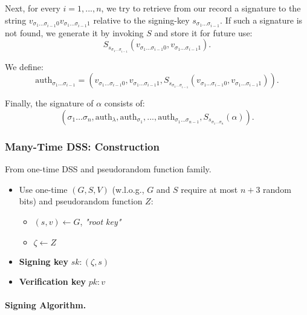 \begin{center}
{\begin{minipage}{\textwidth-1cm}
Next, for every $i = 1, ..., n$, we try to retrieve from our record a signature to the string $v_{\sigma_1 \dots \sigma_{i-1}0} v_{\sigma_1 \dots \sigma_{i-1}1}$ relative to the signing-key $s_{\sigma_1 \dots \sigma_{i-1}}$. If such a signature is not found, we generate it by invoking $S$ and store it for future use:
\[
S_{s_{\sigma_1 \dots \sigma_{i-1}}}(v_{\sigma_1 \dots \sigma_{i-1}0}, v_{\sigma_1 \dots \sigma_{i-1}1}).
\]

We define:
\[
\text{auth}_{\sigma_1 \dots \sigma_{i-1}} = (v_{\sigma_1 \dots \sigma_{i-1}0}, v_{\sigma_1 \dots \sigma_{i-1}1}, S_{s_{\sigma_1 \dots \sigma_{i-1}}}(v_{\sigma_1 \dots \sigma_{i-1}0}, v_{\sigma_1 \dots \sigma_{i-1}1})).
\]

Finally, the signature of $\alpha$ consists of:
\[
(\sigma_1 \dots \sigma_n, \text{auth}_\lambda, \text{auth}_{\sigma_1}, ..., \text{auth}_{\sigma_1 \dots \sigma_{n-1}}, S_{s_{\sigma_1 \dots \sigma_n}}(\alpha)).
\]
\end{minipage}}\end{center}

\subsubsection{Many-Time DSS: Construction}

From one-time DSS and pseudorandom function family.

\begin{itemize}
    \item Use one-time $(G, S, V)$ (w.l.o.g., $G$ and $S$ require at most $n + 3$ random bits) and pseudorandom function $Z$:
    \begin{itemize}
        \item $(s, v) \leftarrow G$, \textit{"root key"}
        \item $\zeta \leftarrow Z$
    \end{itemize}
    \item \textbf{Signing key} $sk: (\zeta, s)$
    \item \textbf{Verification key} $pk: v$
\end{itemize}

\paragraph{Signing Algorithm.}


